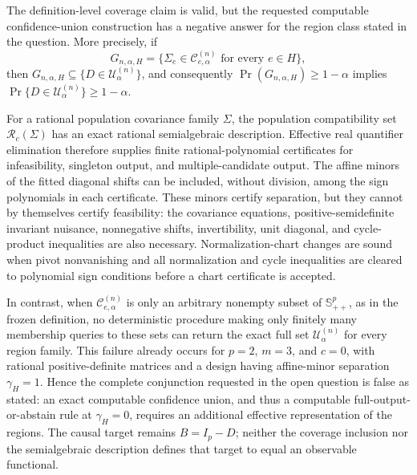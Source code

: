 The definition-level coverage claim is valid, but the requested computable confidence-union construction has a negative answer for the region class stated in the question.  More precisely, if
\[
G_{n,\alpha,H}=\{\Sigma_e\in\mathcal C^{(n)}_{e,\alpha}\text{ for every }e\in H\},
\]
then \(G_{n,\alpha,H}\subseteq\{D\in\mathcal U^{(n)}_\alpha\}\), and consequently \(\Pr(G_{n,\alpha,H})\ge 1-\alpha\) implies \(\Pr\{D\in\mathcal U^{(n)}_\alpha\}\ge1-\alpha\).

For a rational population covariance family \(\Sigma\), the population compatibility set \(\mathcal R_c(\Sigma)\) has an exact rational semialgebraic description.  Effective real quantifier elimination therefore supplies finite rational-polynomial certificates for infeasibility, singleton output, and multiple-candidate output.  The affine minors of the fitted diagonal shifts can be included, without division, among the sign polynomials in each certificate.  These minors certify separation, but they cannot by themselves certify feasibility: the covariance equations, positive-semidefinite invariant nuisance, nonnegative shifts, invertibility, unit diagonal, and cycle-product inequalities are also necessary.  Normalization-chart changes are sound when pivot nonvanishing and all normalization and cycle inequalities are cleared to polynomial sign conditions before a chart certificate is accepted.

In contrast, when \(\mathcal C^{(n)}_{e,\alpha}\) is only an arbitrary nonempty subset of \(\mathbb S_{++}^p\), as in the frozen definition, no deterministic procedure making only finitely many membership queries to these sets can return the exact full set \(\mathcal U^{(n)}_\alpha\) for every region family.  This failure already occurs for \(p=2\), \(m=3\), and \(c=0\), with rational positive-definite matrices and a design having affine-minor separation \(\gamma_H=1\).  Hence the complete conjunction requested in the open question is false as stated: an exact computable confidence union, and thus a computable full-output-or-abstain rule at \(\gamma_H=0\), requires an additional effective representation of the regions.  The causal target remains \(B=I_p-D\); neither the coverage inclusion nor the semialgebraic description defines that target to equal an observable functional.